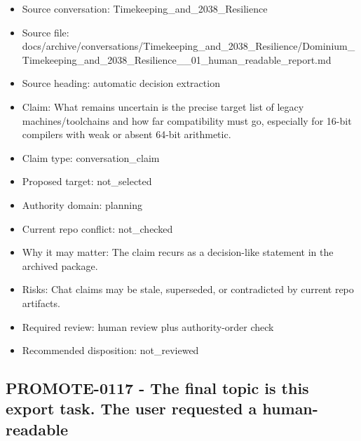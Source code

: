 \documentclass[11pt,a4paper]{report}
\begin{document}
\begin{itemize}
\item Source conversation: Timekeeping\_and\_2038\_Resilience
\item Source file: docs/archive/conversations/Timekeeping\_and\_2038\_Resilience/Dominium\_Timekeeping\_and\_2038\_Resilience\_\_01\_human\_readable\_report.md
\item Source heading: automatic decision extraction
\item Claim: What remains uncertain is the precise target list of legacy machines/toolchains and how far compatibility must go, especially for 16-bit compilers with weak or absent 64-bit arithmetic.
\item Claim type: conversation\_claim
\item Proposed target: not\_selected
\item Authority domain: planning
\item Current repo conflict: not\_checked
\item Why it may matter: The claim recurs as a decision-like statement in the archived package.
\item Risks: Chat claims may be stale, superseded, or contradicted by current repo artifacts.
\item Required review: human review plus authority-order check
\item Recommended disposition: not\_reviewed
\end{itemize}

\subsection{PROMOTE-0117 - The final topic is this export task. The user requested a human-readable}
\end{document}
